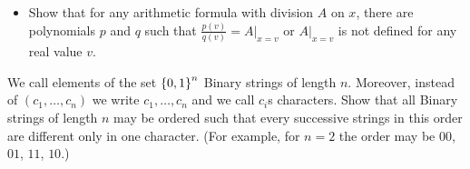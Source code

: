 \begin{chapterendexercises}
\begin{itemize}
            \item Show that for any arithmetic formula with division $A$ on $x$,
                there are polynomials $p$ and $q$ such that $\frac{p(v)}{q(v)} =
                A\big\rvert_{x = v}$ or $A\big\rvert_{x = v}$ is not defined for
                any real value $v$.
        \end{itemize}
    \exercise[recommended]
      We call elements of the set $\set{0, 1}^n$ Binary strings of length
      $n$. Moreover, instead of $(c_1, \dots, c_n)$ we write $c_1, \dots, c_n$
      and we call $c_i$s characters.
      Show that all Binary strings of length $n$
      may be ordered such that every successive strings in this order are
      different only in one character.
      (For example, for $n = 2$ the order may be $00$, $01$, $11$, $10$.)
\end{chapterendexercises}
